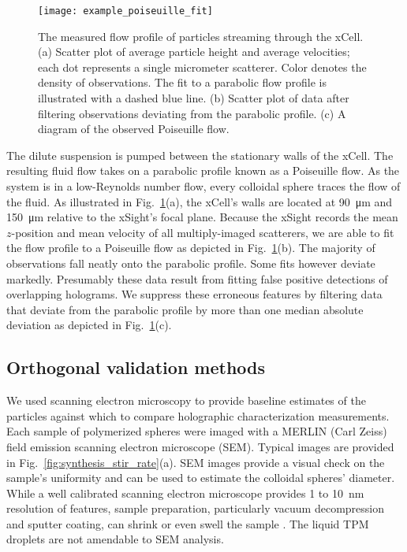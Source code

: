 \begin{figure}
    \centering
    \texttt{[image: example\_poiseuille\_fit]}
    \caption{The measured flow profile of particles streaming through the xCell.
      (a) Scatter plot of average particle height and average velocities; each
      dot represents a single micrometer scatterer. Color denotes the density of
      observations. The fit to a parabolic flow profile is illustrated with a dashed
      blue line. (b) Scatter plot of data after filtering observations deviating
      from the parabolic profile. (c) A diagram of the observed Poiseuille flow.\protect\footnotemark
    }
    \label{fig:flow_prof}
\end{figure}

The dilute suspension is pumped between the stationary walls of the xCell.
The resulting fluid flow takes on a parabolic profile known as a Poiseuille flow.
As the system is in a low-Reynolds number flow, every colloidal sphere traces
the flow of the fluid.
As illustrated in Fig.~\ref{fig:flow_prof}(a), the xCell's walls are located
at \SI{90}{\um} and \SI{150}{\um} relative to the xSight's focal plane.
Because the xSight records the mean $z$-position and mean 
velocity of all multiply-imaged scatterers, we are able to fit the flow
profile to a Poiseuille flow as depicted in Fig.~\ref{fig:flow_prof}(b).
The majority of observations fall neatly onto the parabolic profile. 
Some fits however deviate markedly. Presumably these data result from fitting
false positive detections of overlapping holograms.
We suppress these erroneous features by filtering data that deviate from
the parabolic profile by more than one median absolute deviation
as depicted in Fig.~\ref{fig:flow_prof}(c).

\subsection{Orthogonal validation methods}


We used scanning electron microscopy to provide baseline estimates of the
particles against which to compare holographic characterization measurements.
Each sample of polymerized spheres were imaged with a MERLIN (Carl Zeiss) field
emission scanning electron microscope (SEM).
Typical images are provided in Fig.~\ref{fig:synthesis_stir_rate}(a).
SEM images provide a visual check on the sample's uniformity
and can be used to estimate the colloidal spheres' diameter. While a well calibrated scanning
electron microscope provides \num{1} to \SI{10}{\nm} resolution of features, sample
preparation, particularly vacuum decompression and sputter coating, can shrink or
even swell the sample \cite{yamada85,jung02}. The liquid TPM droplets
are not amendable to SEM analysis.

